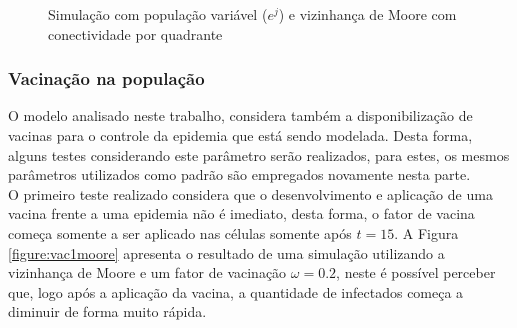 \documentclass[a4paper,12pt]{article}
\begin{document}
\begin{figure}[!ht]
\qquad
{}
\qquad
{}
\caption{Simulação com população variável ($e^j$) e vizinhança de Moore com conectividade por quadrante}
\label{figure:exp3moore}
\end{figure}

\subsubsection{Vacinação na população}

O modelo analisado neste trabalho, considera também a disponibilização de vacinas para o controle da epidemia que está sendo modelada. Desta forma, alguns testes considerando este parâmetro serão realizados, para estes, os mesmos parâmetros utilizados como padrão são empregados novamente nesta parte.\\

O primeiro teste realizado considera que o desenvolvimento e aplicação de uma vacina frente a uma epidemia não é imediato, desta forma, o fator de vacina começa somente a ser aplicado nas células somente após $t = 15$. A Figura \ref{figure:vac1moore} apresenta o resultado de uma simulação utilizando a vizinhança de Moore e um fator de vacinação $\omega = 0.2$, neste é possível perceber que, logo após a aplicação da vacina, a quantidade de infectados começa a diminuir de forma muito rápida. 
\end{document}
